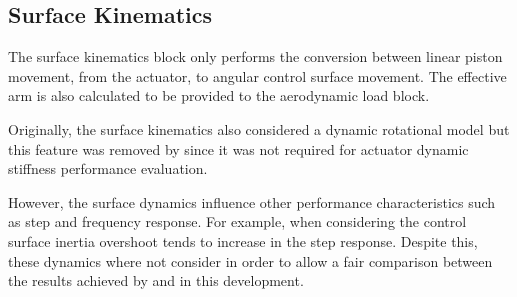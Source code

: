 \subsection{Surface Kinematics}

The surface kinematics block only performs the conversion between linear piston movement, from the actuator, to angular control surface movement. The effective arm is also calculated to be provided to the aerodynamic load block.

Originally, the surface kinematics also considered a dynamic rotational model \cite{Constantino} but this feature was removed by  since it was not required for actuator dynamic stiffness performance evaluation.

However, the surface dynamics influence other performance characteristics such as step and frequency response. For example, when considering the control surface inertia overshoot tends to increase in the step response. Despite this, these dynamics where not consider in order to allow a fair comparison between the results achieved by  and in this development.

